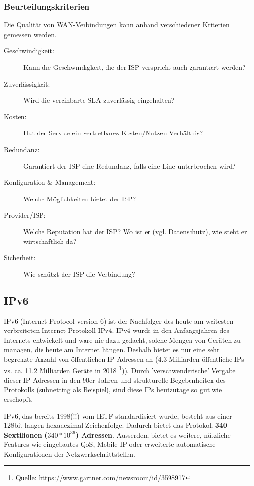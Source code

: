 \documentclass[a4paper, 11pt]{article}
\begin{document}
\subsubsection{Beurteilungskriterien}
Die Qualität von WAN-Verbindungen kann anhand verschiedener Kriterien gemessen werden.

\begin{description}
\item[Geschwindigkeit: ] Kann die Geschwindigkeit, die der ISP verspricht auch garantiert werden?
\item [Zuverlässigkeit: ] Wird die vereinbarte SLA zuverlässig eingehalten?
\item[Kosten: ] Hat der Service ein vertretbares Kosten/Nutzen Verhältnis?
\item[Redundanz: ] Garantiert der ISP eine Redundanz, falls eine Line unterbrochen wird?
\item[Konfiguration \& Management: ] Welche Möglichkeiten bietet der ISP?
\item[Provider/ISP: ] Welche Reputation hat der ISP? Wo ist er (vgl. Datenschutz), wie steht er wirtschaftlich da?
\item[Sicherheit: ] Wie schützt der ISP die Verbindung?
\end{description}

\subsection{IPv6}
IPv6 (Internet Protocol version 6) ist der Nachfolger des heute am weitesten verbreiteten Internet Protokoll IPv4. IPv4 wurde in den Anfangsjahren des Internets entwickelt und ware nie dazu gedacht, solche Mengen von Geräten zu managen, die heute am Internet hängen. Deshalb bietet es nur eine sehr begrenzte Anzahl von öffentlichen IP-Adressen an (4.3 Milliarden öffentliche IPs vs. ca. 11.2 Milliarden Geräte in 2018 \footnote{Quelle: https://www.gartner.com/newsroom/id/3598917})). Durch 'verschwenderische' Vergabe dieser IP-Adressen in den 90er Jahren und strukturelle Begebenheiten des Protokolls (subnetting als Beispiel), sind diese IPs heutzutage so gut wie erschöpft.

IPv6, das bereits 1998(!!) vom IETF standardisiert wurde, besteht aus einer 128bit langen hexadezimal-Zeichenfolge. Dadurch bietet das Protokoll \textbf{340 Sextilionen ($340 * 10^{36} $) Adressen}. Ausserdem bietet es weitere, nützliche Features wie eingebautes QoS, Mobile IP oder erweiterte automatische Konfigurationen der Netzwerkschnittstellen.
\end{document}
